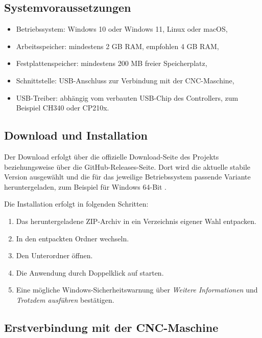 \subsection{Systemvoraussetzungen}

\begin{itemize}
	\item Betriebssystem: Windows 10 oder Windows 11, Linux oder macOS,
	\item Arbeitsspeicher: mindestens 2 GB RAM, empfohlen 4 GB RAM,
	\item Festplattenspeicher: mindestens 200 MB freier Speicherplatz,
	\item Schnittstelle: USB-Anschluss zur Verbindung mit der CNC-Maschine,
	\item USB-Treiber: abhängig vom verbauten USB-Chip des Controllers, zum Beispiel CH340 oder CP210x.
\end{itemize}

\subsection{Download und Installation}

Der Download erfolgt über die offizielle Download-Seite des Projekts beziehungsweise über die GitHub-Releases-Seite. Dort wird die aktuelle stabile Version ausgewählt und die für das jeweilige Betriebssystem passende Variante heruntergeladen, zum Beispiel  für Windows 64-Bit \cite{ugs:github}.

Die Installation erfolgt in folgenden Schritten:

\begin{enumerate}
	\item Das heruntergeladene ZIP-Archiv in ein Verzeichnis eigener Wahl entpacken.
	\item In den entpackten Ordner wechseln.
	\item Den Unterordner  öffnen.
	\item Die Anwendung durch Doppelklick auf  starten.
	\item Eine mögliche Windows-Sicherheitswarnung über \emph{Weitere Informationen} und \emph{Trotzdem ausführen} bestätigen.
\end{enumerate}

\subsection{Erstverbindung mit der CNC-Maschine}

